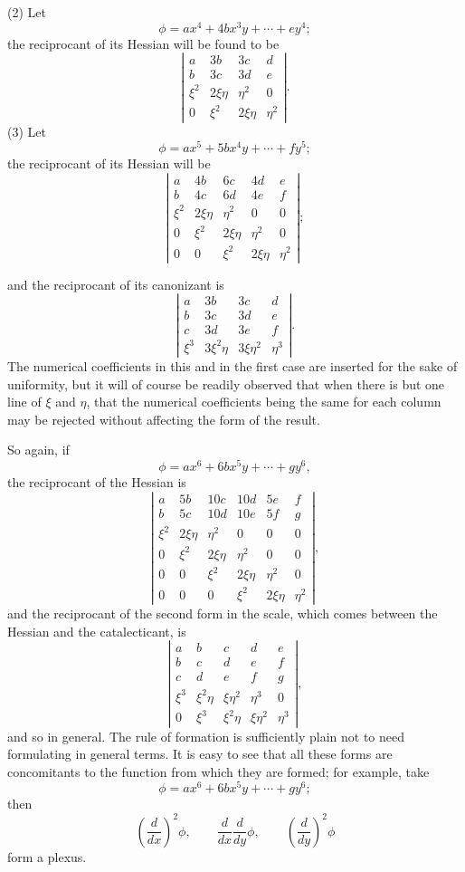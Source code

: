 \documentclass[11pt]{article}
\newcommand{\sourcepage}[1]{\marginpar{\scriptsize p.~#1}}
\begin{document}
(2) Let
\[
\phi=ax^4+4bx^3y+\cdots+ey^4;
\]
the reciprocant of its Hessian will be found to be
\[
\left|\begin{array}{cccc}
a&3b&3c&d\\
b&3c&3d&e\\
\xi^2&2\xi\eta&\eta^2&0\\
0&\xi^2&2\xi\eta&\eta^2
\end{array}\right|.
\]
(3) Let
\[
\phi=ax^5+5bx^4y+\cdots+fy^5;
\]
the reciprocant of its Hessian will be
\[
\left|\begin{array}{ccccc}
a&4b&6c&4d&e\\
b&4c&6d&4e&f\\
\xi^2&2\xi\eta&\eta^2&0&0\\
0&\xi^2&2\xi\eta&\eta^2&0\\
0&0&\xi^2&2\xi\eta&\eta^2
\end{array}\right|;
\]

\sourcepage{344}
and the reciprocant of its canonizant is
\[
\left|\begin{array}{cccc}
a&3b&3c&d\\
b&3c&3d&e\\
c&3d&3e&f\\
\xi^3&3\xi^2\eta&3\xi\eta^2&\eta^3
\end{array}\right|.
\]
The numerical coefficients in this and in the first case are inserted for the sake of uniformity, but it will of course be readily observed that when there is but one line of $\xi$ and $\eta$, that the numerical coefficients being the same for each column may be rejected without affecting the form of the result.

So again, if
\[
\phi=ax^6+6bx^5y+\cdots+gy^6,
\]
the reciprocant of the Hessian is
\[
\left|\begin{array}{cccccc}
a&5b&10c&10d&5e&f\\
b&5c&10d&10e&5f&g\\
\xi^2&2\xi\eta&\eta^2&0&0&0\\
0&\xi^2&2\xi\eta&\eta^2&0&0\\
0&0&\xi^2&2\xi\eta&\eta^2&0\\
0&0&0&\xi^2&2\xi\eta&\eta^2
\end{array}\right|,
\]
and the reciprocant of the second form in the scale, which comes between the Hessian and the catalecticant, is
\[
\left|\begin{array}{ccccc}
a&b&c&d&e\\
b&c&d&e&f\\
c&d&e&f&g\\
\xi^3&\xi^2\eta&\xi\eta^2&\eta^3&0\\
0&\xi^3&\xi^2\eta&\xi\eta^2&\eta^3
\end{array}\right|,
\]
and so in general. The rule of formation is sufficiently plain not to need formulating in general terms. It is easy to see that all these forms are concomitants to the function from which they are formed; for example, take
\[
\phi=ax^6+6bx^5y+\cdots+gy^6;
\]
then
\[
\left(\frac{d}{dx}\right)^2\phi,\qquad
\frac{d}{dx}\frac{d}{dy}\phi,\qquad
\left(\frac{d}{dy}\right)^2\phi
\]
form a plexus.
\end{document}

